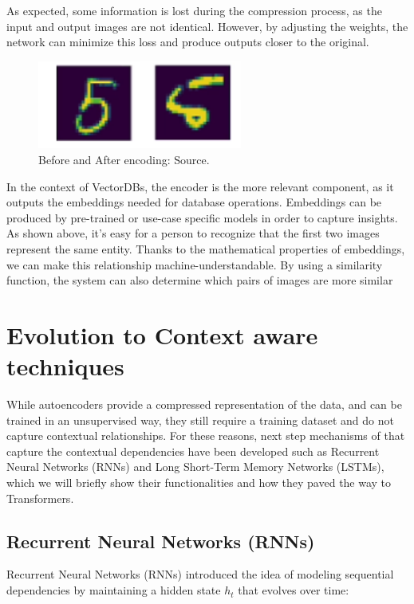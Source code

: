 As expected, some information is lost during the compression process, as the input and output images are not identical. However, by adjusting the weights, the network can minimize this loss and produce outputs closer to the original.
\begin{figure}[h]
    \centering
    \includegraphics[width=0.6\textwidth]{IMAGES/immagine_2025-02-26_155109338.png}
    \caption[MNIST Results]{Before and After encoding:
 Source.\footnotemark[3]}
    \label{fig:2D}
\end{figure}

In the context of VectorDBs, the encoder is the more relevant component, as it outputs the embeddings needed for database operations. Embeddings can be produced by pre-trained or use-case specific models in order to capture insights.
As shown above, it’s easy for a person to recognize that the first two images represent the same entity. Thanks to the mathematical properties of embeddings, we can make this relationship machine-understandable. By using a similarity function, the system can also determine which pairs of images are more similar
\section{Evolution to Context aware techniques}
While autoencoders provide a compressed representation of the data, and can be trained in an unsupervised way, they still require a training dataset and do not capture contextual relationships. For these reasons, next step mechanisms of that capture the contextual dependencies have been developed such as Recurrent Neural Networks (RNNs) and Long Short-Term Memory Networks (LSTMs), which we will briefly show their functionalities and how they paved the way to Transformers.

\subsection{Recurrent Neural Networks (RNNs)}

Recurrent Neural Networks (RNNs) introduced the idea of modeling sequential dependencies by maintaining a hidden state \( h_t \) that evolves over time:

